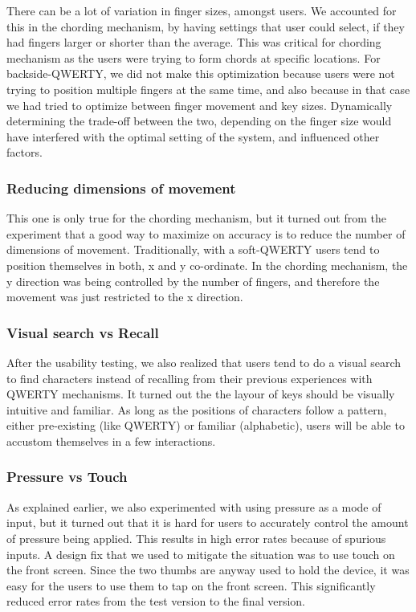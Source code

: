 There can be a lot of variation in finger sizes, amongst users. We
accounted for this in the chording mechanism, by having settings that
user could select, if they had fingers larger or shorter than the
average. This was critical for chording mechanism as the users were
trying to form chords at specific locations. For backside-QWERTY, we
did not make this optimization because users were not trying to
position multiple fingers at the same time, and also because in that
case we had tried to optimize between finger movement and key
sizes. Dynamically determining the trade-off between the two,
depending on the finger size would have interfered with the optimal
setting of the system, and influenced other factors.

\subsubsection{Reducing dimensions of movement}

This one is only true for the chording mechanism, but it turned out
from the experiment that a good way to maximize on accuracy is to
reduce the number of dimensions of movement. Traditionally, with a
soft-QWERTY users tend to position themselves in both, x and y
co-ordinate. In the chording mechanism, the y direction was being
controlled by the number of fingers, and therefore the movement was
just restricted to the x direction.

\subsubsection{Visual search vs Recall}

After the usability testing, we also realized that users tend to do a
visual search to find characters instead of recalling from their
previous experiences with QWERTY mechanisms. It turned out the the
layour of keys should be visually intuitive and familiar. As long as
the positions of characters follow a pattern, either pre-existing
(like QWERTY) or familiar (alphabetic), users will be able to accustom
themselves in a few interactions.

\subsubsection{Pressure vs Touch}

As explained earlier, we also experimented with using pressure as a
mode of input, but it turned out that it is hard for users to
accurately control the amount of pressure being applied. This results
in high error rates because of spurious inputs. A design fix that we
used to mitigate the situation was to use touch on the front
screen. Since the two thumbs are anyway used to hold the device, it
was easy for the users to use them to tap on the front screen. This
significantly reduced error rates from the test version to the final
version.


